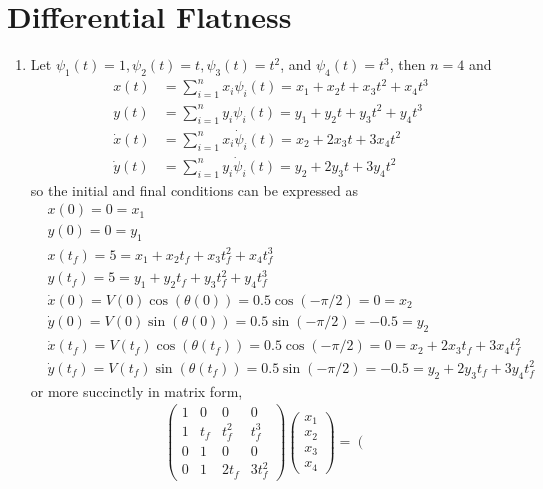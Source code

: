 \documentclass[12pt]{article}
\begin{document}
\section{Differential Flatness}
\begin{enumerate}
	\item Let $\psi_1(t) = 1, \psi_2(t) = t, \psi_3(t) = t^2$, and $\psi_4(t) = t^3$, then $n = 4$ and
	\begin{align*}
		x(t) &= \sum_{i=1}^n x_i\psi_i(t) = x_1 + x_2t + x_3t^2 + x_4t^3 \\
		y(t) &= \sum_{i=1}^n y_i\psi_i(t) = y_1 + y_2t + y_3t^2 + y_4t^3 \\
		\dot x(t) &= \sum_{i=1}^n x_i\dot \psi_i(t) = x_2 + 2x_3t + 3x_4t^2 \\
		\dot y(t) &= \sum_{i=1}^n y_i\dot \psi_i(t) = y_2 + 2y_3t + 3y_4t^2
	\end{align*}
	so the initial and final conditions can be expressed as
	\begin{align*}
		&x(0) = 0 = x_1 \\
		&y(0) = 0 = y_1 \\
		&x(t_f) = 5 = x_1 + x_2t_f + x_3t_f^2 + x_4t_f^3 \\
		&y(t_f) = 5 = y_1 + y_2t_f + y_3t_f^2 + y_4t_f^3 \\
		&\dot x(0) = V(0)\cos(\theta(0)) = 0.5\cos(-\pi/2) = 0 = x_2 \\
		&\dot y(0) = V(0)\sin(\theta(0)) = 0.5\sin(-\pi/2) = -0.5 = y_2 \\
		&\dot x(t_f) = V(t_f)\cos(\theta(t_f)) = 0.5\cos(-\pi/2) = 0 = x_2 + 2x_3t_f + 3x_4t_f^2 \\
		&\dot y(t_f) = V(t_f)\sin(\theta(t_f)) = 0.5\sin(-\pi/2) = -0.5 = y_2 + 2y_3t_f + 3y_4t_f^2
	\end{align*}
	or more succinctly in matrix form,
	\begin{align*}
		\left(\begin{array}{cccc}
		1 & 0 & 0 & 0 \\
		1 & t_f & t_f^2 & t_f^3 \\
		0 & 1 & 0 & 0 \\
		0 & 1 & 2t_f & 3t_f^2
		\end{array}\right)
		\left(\begin{array}{c}
		x_1 \\
		x_2 \\
		x_3 \\
		x_4
		\end{array}\right) =
		\left(\begin{array}{cccc}

\end{array}
\end{align*}
\end{enumerate}
\end{document}
